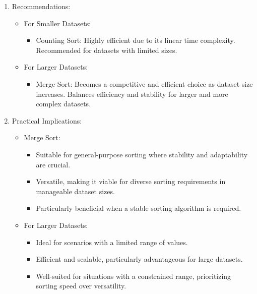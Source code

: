 \documentclass[12pt,twocolumn]{article}
\begin{document}
\begin{enumerate}
\begin{itemize}
\begin{itemize}
        \end{itemize}
    \end{itemize}
    \item  Recommendations:
        \begin{itemize}
        \item For Smaller Datasets:
        \begin{itemize}
            \item Counting Sort: Highly efficient due to its linear time complexity. Recommended for datasets with limited sizes.
        \end{itemize}
        \item For Larger Datasets:
        \begin{itemize}
            \item Merge Sort: Becomes a competitive and efficient choice as dataset size increases. Balances efficiency and stability for larger and more complex datasets.
        \end{itemize}
    \end{itemize}
    \item  Practical Implications:
        \begin{itemize}
        \item Merge Sort:
        \begin{itemize}
            \item Suitable for general-purpose sorting where stability and adaptability are crucial.
            \item Versatile, making it viable for diverse sorting requirements in manageable dataset sizes.
            \item Particularly beneficial when a stable sorting algorithm is required.
        \end{itemize}
        \item For Larger Datasets:
        \begin{itemize}
            \item Ideal for scenarios with a limited range of values.
            \item Efficient and scalable, particularly advantageous for large datasets.
            \item Well-suited for situations with a constrained range, prioritizing sorting speed over versatility.
        \end{itemize}
    \end{itemize}
\end{enumerate}
\end{document}
